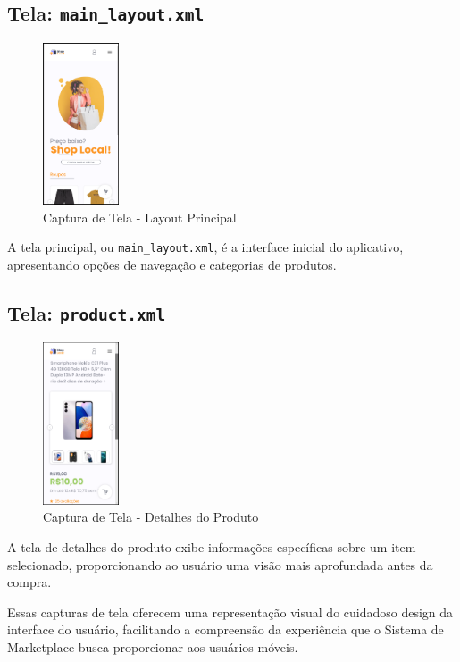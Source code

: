 \documentclass[
	12pt,				%
	openright,			%
	twoside,			%
	a4paper,			%
	english,			%
	brazil				%
	]{abntex2}
\begin{document}
\subsection{Tela: \texttt{main\_layout.xml}}

\begin{figure}[htb]
    \centering
    \includegraphics[width=0.2\textwidth]{img/main_layout}
    \caption{Captura de Tela - Layout Principal}
\end{figure}

A tela principal, ou \texttt{main\_layout.xml}, é a interface inicial do aplicativo, apresentando opções de navegação e categorias de produtos.

\subsection{Tela: \texttt{product.xml}}

\begin{figure}[htb]
    \centering
    \includegraphics[width=0.2\textwidth]{img/product}
    \caption{Captura de Tela - Detalhes do Produto}
\end{figure}

A tela de detalhes do produto exibe informações específicas sobre um item selecionado, proporcionando ao usuário uma visão mais aprofundada antes da compra.

Essas capturas de tela oferecem uma representação visual do cuidadoso design da interface do usuário, facilitando a compreensão da experiência que o Sistema de Marketplace busca proporcionar aos usuários móveis.
\end{document}

